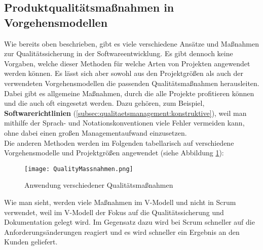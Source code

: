 \subsection{Produktqualitätsmaßnahmen in Vorgehensmodellen}
\label{subsec:qualitaetsmanagement:vorgehensmodelle}
Wie bereits oben beschrieben, gibt es viele verschiedene Ansätze und Maßnahmen zur Qualitätssicherung in der Softwareentwicklung. Es gibt dennoch keine Vorgaben, welche dieser Methoden für welche Arten von Projekten angewendet werden können. 
Es lässt sich aber sowohl aus den Projektgrößen als auch der verwendeten Vorgehensmodellen die passenden Qualitätsmaßnahmen herausleiten. Dabei gibt es allgemeine Maßnahmen, durch die alle Projekte profitieren können und die auch oft eingesetzt werden.
Dazu gehören, zum Beispiel, \textbf{Softwarerichtlinien} (\ref{subsec:qualitaetsmanagement:konstruktive}), weil man mithilfe der Sprach- und Notationskonventionen viele Fehler vermeiden kann, ohne dabei einen großen Managementaufwand einzusetzen. 
\\Die anderen Methoden werden im Folgenden tabellarisch auf verschiedene Vorgehensmodelle und Projektgrößen angewendet (siehe Abbildung \ref{fig:quality_sicherheit}):
\begin{figure}
\centering
    \texttt{[image: QualityMassnahmen.png]} 
    \caption{Anwendung verschiedener Qualitätsmaßnahmen}
    \label{fig:quality_sicherheit}
\end{figure}
Wie man sieht, werden viele Maßnahmen im V-Modell und nicht in Scrum verwendet, weil im V-Modell der Fokus auf die Qualitätssicherung und Dokumentation gelegt wird. Im Gegensatz dazu wird bei Scrum schneller auf die Anforderungsänderungen reagiert
und es wird schneller ein Ergebnis an den Kunden geliefert. 